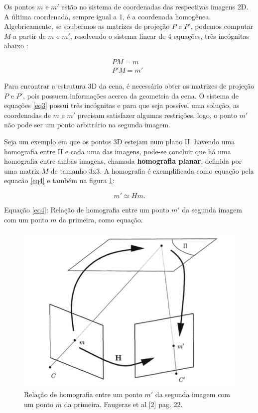 Os pontos $m$ e $m'$ estão no sistema de coordenadas das respectivas imagens 2D. A última coordenada, sempre igual a 1, é a coordenada homogênea.
Algebricamente, se soubermos as matrizes de projeção $P$ e $P'$, podemos computar $M$ a partir de $m$ e $m'$, resolvendo o sistema linear de 4 equações, três incógnitas abaixo \cite{Faugeras-Geometry}:

\begin{equation}\label{eq3}
\begin{aligned}
	PM = m \\
	P'M = m'
\end{aligned} \; \;
\end{equation}

Para encontrar a estrutura 3D da cena, é necessário obter as matrizes de projeção $P$ e $P'$, pois possuem informações acerca da geometria da cena. O sistema de equações \eqref{eq3} possui três incógnitas e para que seja possível uma solução, as coordenadas de $m$ e $m'$ precisam satisfazer algumas restrições, logo, o ponto $m'$ não pode ser um ponto arbitrário na segunda imagem.

Seja um exemplo em que os pontos 3D estejam num plano II, havendo uma homografia \cite{Faugeras-Geometry} entre II e cada uma das imagens, pode-se concluir que há uma homografia entre ambas imagens, chamada \textbf{homografia planar}, definida por uma matriz $M$ de tamanho 3x3. A homografia é exemplificada como equação pela equacão \eqref{eq4} e também na figura \ref{fig1}:

\begin{equation}\label{eq4}
m' \simeq Hm.
\end{equation}

Equação \eqref{eq4}: Relação de homografia entre um ponto $m'$ da segunda imagem com um ponto $m$ da primeira, como equação.

\begin{figure}[H]
	\centering
		\includegraphics{Imagens/figura2-1.png}
	\caption{Relação de homografia entre um ponto $m'$ da segunda imagem com um ponto $m$ da primeira. Faugeras et al [2] pag. 22.}
	\label{fig1}
\end{figure}


